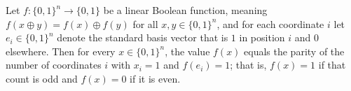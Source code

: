 \begin{lemma}
\label{BoolBLR.linear_bool_iff_character_aux_h_fx_2}
\leanok
{}
Let $f : \{0,1\}^n \to \{0,1\}$ be a linear Boolean function, meaning $f(x \oplus y) =
f(x) \oplus f(y)$ for all $x, y \in \{0,1\}^n$, and for each coordinate $i$ let $e_i \in
\{0,1\}^n$ denote the standard basis vector that is $1$ in position $i$ and $0$
elsewhere. Then for every $x \in \{0,1\}^n$, the value $f(x)$ equals the parity of the
number of coordinates $i$ with $x_i = 1$ and $f(e_i) = 1$; that is, $f(x) = 1$ if that
count is odd and $f(x) = 0$ if it is even.
\end{lemma}

